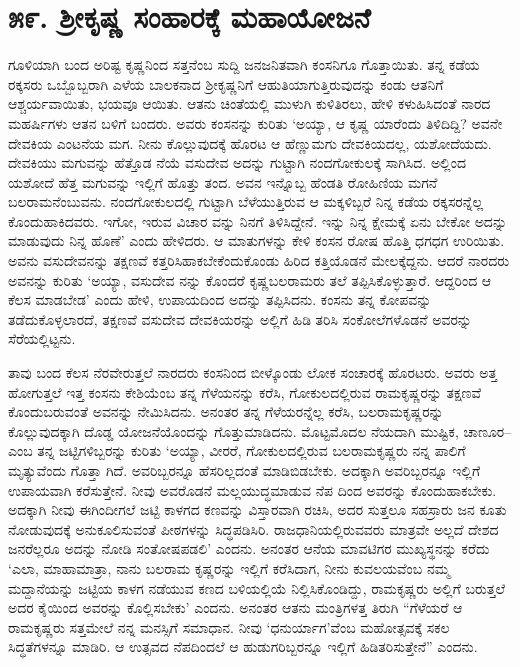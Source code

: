 
\chapter{೫೯. ಶ್ರೀಕೃಷ್ಣ ಸಂಹಾರಕ್ಕೆ ಮಹಾಯೋಜನೆ}

ಗೂಳಿಯಾಗಿ ಬಂದ ಅರಿಷ್ಟ ಕೃಷ್ಣನಿಂದ ಸತ್ತನೆಂಬ ಸುದ್ದಿ ಜನಜನಿತವಾಗಿ ಕಂಸನಿಗೂ ಗೊತ್ತಾಯಿತು. ತನ್ನ ಕಡೆಯ ರಕ್ಕಸರು ಒಬ್ಬೊಬ್ಬರಾಗಿ ಎಳೆಯ ಬಾಲಕನಾದ ಶ್ರೀಕೃಷ್ಣನಿಗೆ ಆಹುತಿಯಾಗುತ್ತಿರುವುದನ್ನು ಕಂಡು ಆತನಿಗೆ ಆಶ್ಚರ್ಯವಾಯಿತು, ಭಯವೂ ಆಯಿತು. ಆತನು ಚಿಂತೆಯಲ್ಲಿ ಮುಳುಗಿ ಕುಳಿತಿರಲು, ಹೇಳಿ ಕಳುಹಿಸಿದಂತೆ ನಾರದ ಮಹರ್ಷಿಗಳು ಆತನ ಬಳಿಗೆ ಬಂದರು. ಅವರು ಕಂಸನನ್ನು ಕುರಿತು ‘ಅಯ್ಯಾ, ಆ ಕೃಷ್ಣ ಯಾರೆಂದು ತಿಳಿದಿದ್ದಿ? ಅವನೇ ದೇವಕಿಯ ಎಂಟನೆಯ ಮಗ. ನೀನು ಕೊಲ್ಲುವುದಕ್ಕೆ ಹೊರಟ ಆ ಹೆಣ್ಣುಮಗು ದೇವಕಿಯದಲ್ಲ, ಯಶೋದೆಯದು. ದೇವಕಿಯು ಮಗುವನ್ನು ಹೆತ್ತೊಡ ನೆಯೆ ವಸುದೇವ ಅದನ್ನು ಗುಟ್ಟಾಗಿ ನಂದಗೋಕುಲಕ್ಕೆ ಸಾಗಿಸಿದ. ಅಲ್ಲಿಂದ ಯಶೋದೆ ಹೆತ್ತ ಮಗುವನ್ನು ಇಲ್ಲಿಗೆ ಹೊತ್ತು ತಂದ. ಅವನ ಇನ್ನೊಬ್ಬ ಹೆಂಡತಿ ರೋಹಿಣಿಯ ಮಗನೆ ಬಲರಾಮನೆಂಬುವನು. ನಂದಗೋಕುಲದಲ್ಲಿ ಗುಟ್ಟಾಗಿ ಬೆಳೆಯುತ್ತಿರುವ ಆ ಮಕ್ಕಳಿಬ್ಬರೆ ನಿನ್ನ ಕಡೆಯ ರಕ್ಕಸರನ್ನೆಲ್ಲ ಕೊಂದುಹಾಕಿದವರು. ಇಗೋ, ಇರುವ ವಿಚಾರ ವನ್ನು ನಿನಗೆ ತಿಳಿಸಿದ್ದೇನೆ. ಇನ್ನು ನಿನ್ನ ಕ್ಷೇಮಕ್ಕೆ ಏನು ಬೇಕೋ ಅದನ್ನು ಮಾಡುವುದು ನಿನ್ನ ಹೊಣೆ’ ಎಂದು ಹೇಳಿದರು. ಆ ಮಾತುಗಳನ್ನು ಕೇಳಿ ಕಂಸನ ರೋಷ ಹೊತ್ತಿ ಧಗಧಗ ಉರಿಯಿತು. ಅವನು ವಸುದೇವನನ್ನು ತಕ್ಷಣವೆ ಕತ್ತರಿಸಿಹಾಕಬೇಕೆಂದುಕೊಂಡು ಹಿರಿದ ಕತ್ತಿಯೊಡನೆ ಮೇಲಕ್ಕೆದ್ದನು. ಆದರೆ ನಾರದರು ಅವನನ್ನು ಕುರಿತು ‘ಅಯ್ಯಾ, ವಸುದೇವ ನನ್ನು ಕೊಂದರೆ ಕೃಷ್ಣಬಲರಾಮರು ತಲೆ ತಪ್ಪಿಸಿಕೊಳ್ಳುತ್ತಾರೆ. ಆದ್ದರಿಂದ ಆ ಕೆಲಸ ಮಾಡಬೇಡ’ ಎಂದು ಹೇಳಿ, ಉಪಾಯದಿಂದ ಅದನ್ನು ತಪ್ಪಿಸಿದನು. ಕಂಸನು ತನ್ನ ಕೋಪವನ್ನು ತಡೆದುಕೊಳ್ಳಲಾರದೆ, ತಕ್ಷಣವೆ ವಸುದೇವ ದೇವಕಿಯರನ್ನು ಅಲ್ಲಿಗೆ ಹಿಡಿ ತರಿಸಿ ಸಂಕೋಲೆಗಳೊಡನೆ ಅವರನ್ನು ಸೆರೆಯಲ್ಲಿಟ್ಟನು.

ತಾವು ಬಂದ ಕೆಲಸ ನೆರವೇರುತ್ತಲೆ ನಾರದರು ಕಂಸನಿಂದ ಬೀಳ್ಕೊಂಡು ಲೋಕ ಸಂಚಾರಕ್ಕೆ ಹೊರಟರು. ಅವರು ಅತ್ತ ಹೋಗುತ್ತಲೆ ಇತ್ತ ಕಂಸನು ಕೇಶಿಯೆಂಬ ತನ್ನ ಗೆಳೆಯನನ್ನು ಕರೆಸಿ, ಗೋಕುಲದಲ್ಲಿರುವ ರಾಮಕೃಷ್ಣರನ್ನು ತಕ್ಷಣವೆ ಕೊಂದುಬರುವಂತೆ ಅವನನ್ನು ನೇಮಿಸಿದನು. ಅನಂತರ ತನ್ನ ಗೆಳೆಯರನ್ನೆಲ್ಲ ಕರೆಸಿ, ಬಲರಾಮಕೃಷ್ಣರನ್ನು ಕೊಲ್ಲುವುದಕ್ಕಾಗಿ ದೊಡ್ಡ ಯೋಜನೆಯೊಂದನ್ನು ಗೊತ್ತುಮಾಡಿದನು. ಮೊಟ್ಟಮೊದಲ ನೆಯದಾಗಿ ಮುಷ್ಟಿಕ, ಚಾಣೂರ–ಎಂಬ ತನ್ನ ಜಟ್ಟಿಗಳಿಬ್ಬರನ್ನು ಕುರಿತು ‘ಅಯ್ಯಾ, ವೀರರೆ, ಗೋಕುಲದಲ್ಲಿರುವ ಬಲರಾಮಕೃಷ್ಣರು ನನ್ನ ಪಾಲಿಗೆ ಮೃತ್ಯುವೆಂದು ಗೊತ್ತಾ ಗಿದೆ. ಅವರಿಬ್ಬರನ್ನೂ ಹೆಸರಿಲ್ಲದಂತೆ ಮಾಡಿಬಿಡಬೇಕು. ಅದಕ್ಕಾಗಿ ಅವರಿಬ್ಬರನ್ನೂ ಇಲ್ಲಿಗೆ ಉಪಾಯವಾಗಿ ಕರೆಸುತ್ತೇನೆ. ನೀವು ಅವರೊಡನೆ ಮಲ್ಲಯುದ್ಧಮಾಡುವ ನೆಪ ದಿಂದ ಅವರನ್ನು ಕೊಂದುಹಾಕಬೇಕು. ಅದಕ್ಕಾಗಿ ನೀವು ಈಗಿಂದೀಗಲೆ ಜಟ್ಟಿ ಕಾಳಗದ ಕಣವನ್ನು ವಿಸ್ತಾರವಾಗಿ ರಚಿಸಿ, ಅದರ ಸುತ್ತಲೂ ಸಹಸ್ರಾರು ಜನ ಕೂತು ನೋಡುವುದಕ್ಕೆ ಅನುಕೂಲಿಸುವಂತೆ ಪೀಠಗಳನ್ನು ಸಿದ್ಧಪಡಿಸಿರಿ. ರಾಜಧಾನಿಯಲ್ಲಿರುವವರು ಮಾತ್ರವೇ ಅಲ್ಲದೆ ದೇಶದ ಜನರೆಲ್ಲರೂ ಅದನ್ನು ನೋಡಿ ಸಂತೋಷಪಡಲಿ’ ಎಂದನು. ಅನಂತರ ಆನೆಯ ಮಾವಟಿಗರ ಮುಖ್ಯಸ್ಥನನ್ನು ಕರೆದು ‘ಎಲಾ, ಮಾಹಾಮಾತ್ರಾ, ನಾನು ಬಲರಾಮ ಕೃಷ್ಣರನ್ನು ಇಲ್ಲಿಗೆ ಕರೆಸಿದಾಗ, ನೀನು ಕುವಲಯವೆಂಬ ನಮ್ಮ ಮದ್ದಾನೆಯನ್ನು ಜಟ್ಟಿಯ ಕಾಳಗ ನಡೆಯುವ ಕಣದ ಬಳಿಯಲ್ಲಿಯೆ ನಿಲ್ಲಿಸಿಕೊಂಡಿದ್ದು, ರಾಮಕೃಷ್ಣರು ಅಲ್ಲಿಗೆ ಬರುತ್ತಲೆ ಅದರ ಕೈಯಿಂದ ಅವರನ್ನು ಕೊಲ್ಲಿಸಬೇಕು’ ಎಂದನು. ಅನಂತರ ಆತನು ಮಂತ್ರಿಗಳತ್ತ ತಿರುಗಿ “ಗೆಳೆಯರೆ ಆ ರಾಮಕೃಷ್ಣರು ಸತ್ತಮೇಲೆ ನನ್ನ ಮನಸ್ಸಿಗೆ ಸಮಾಧಾನ. ನೀವು ‘ಧನುರ್ಯಾಗ’ವೆಂಬ ಮಹೋತ್ಸವಕ್ಕೆ ಸಕಲ ಸಿದ್ಧತೆಗಳನ್ನೂ ಮಾಡಿರಿ. ಆ ಉತ್ಸವದ ನೆಪದಿಂದಲೆ ಆ ಹುಡುಗರಿಬ್ಬರನ್ನೂ ಇಲ್ಲಿಗೆ ಹಿಡಿತರಿಸುತ್ತೇನೆ” ಎಂದನು.

